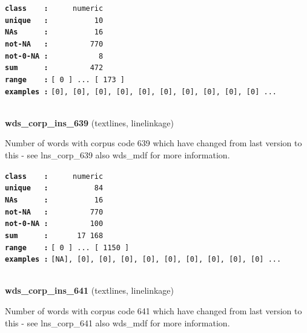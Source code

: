 \documentclass[]{article}
\begin{document}
\textbf{\texttt{class\ \ \ \ :}} \texttt{~~~~~numeric}\\
\textbf{\texttt{unique\ \ \ :}} \texttt{~~~~~~~~~~10}\\
\textbf{\texttt{NAs\ \ \ \ \ \ :}} \texttt{~~~~~~~~~~16}\\
\textbf{\texttt{not-NA\ \ \ :}} \texttt{~~~~~~~~~770}\\
\textbf{\texttt{not-0-NA\ :}} \texttt{~~~~~~~~~~~8}\\
\textbf{\texttt{sum\ \ \ \ \ \ :}} \texttt{~~~~~~~~~472}\\
\textbf{\texttt{range\ \ \ \ :}}
\texttt{{[}\ 0\ {]}\ ...\ {[}\ 173\ {]}}\\
\textbf{\texttt{examples\ :}}
\texttt{{[}0{]},\ {[}0{]},\ {[}0{]},\ {[}0{]},\ {[}0{]},\ {[}0{]},\ {[}0{]},\ {[}0{]},\ {[}0{]},\ {[}0{]}\ ...}\\

~

\textbf{wds\_corp\_ins\_639} (textlines, linelinkage)

Number of words with corpus code 639 which have changed from last
version to this - see lns\_corp\_639 also wds\_mdf for more information.

\textbf{\texttt{class\ \ \ \ :}} \texttt{~~~~~numeric}\\
\textbf{\texttt{unique\ \ \ :}} \texttt{~~~~~~~~~~84}\\
\textbf{\texttt{NAs\ \ \ \ \ \ :}} \texttt{~~~~~~~~~~16}\\
\textbf{\texttt{not-NA\ \ \ :}} \texttt{~~~~~~~~~770}\\
\textbf{\texttt{not-0-NA\ :}} \texttt{~~~~~~~~~100}\\
\textbf{\texttt{sum\ \ \ \ \ \ :}} \texttt{~~~~~~17~168}\\
\textbf{\texttt{range\ \ \ \ :}}
\texttt{{[}\ 0\ {]}\ ...\ {[}\ 1150\ {]}}\\
\textbf{\texttt{examples\ :}}
\texttt{{[}NA{]},\ {[}0{]},\ {[}0{]},\ {[}0{]},\ {[}0{]},\ {[}0{]},\ {[}0{]},\ {[}0{]},\ {[}0{]},\ {[}0{]}\ ...}\\

~

\textbf{wds\_corp\_ins\_641} (textlines, linelinkage)

Number of words with corpus code 641 which have changed from last
version to this - see lns\_corp\_641 also wds\_mdf for more information.
\end{document}
